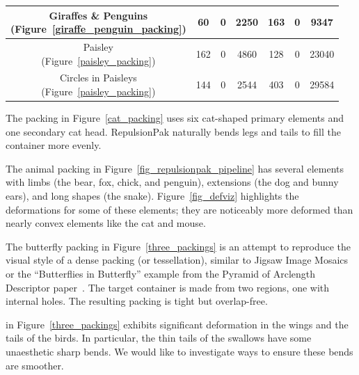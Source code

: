 \begin{table}[t]
{\begin{tabular}{|c|c|c|c|c|c|c|}
\makecell{Giraffes \& Penguins \\(Figure~\ref{giraffe_penguin_packing})}       
& 60    & 0   & 2250  & 163  & 0   & 9347\\ \hline

\makecell{Paisley\\(Figure~\ref{paisley_packing})  }    
& 162   & 0    & 4860  & 128  & 0   & 23040\\ \hline

\makecell{Circles in Paisleys \\(Figure~\ref{paisley_packing})}     
& 144   & 0    & 2544  & 403  & 0   & 29584\\ \hline
\end{tabular}
}
\end{table}





The packing in Figure~\ref{cat_packing} 
uses six cat-shaped primary elements and one secondary cat head.
RepulsionPak naturally bends legs and tails to fill the container more evenly.

The animal packing in Figure~\ref{fig_repulsionpak_pipeline} 
has several elements with limbs (the bear, fox, chick, and penguin),  
extensions (the dog and bunny ears), and long shapes (the snake).
Figure~\ref{fig_defviz} highlights the deformations for some of these elements;
they are noticeably more deformed 
than nearly convex elements like the cat and mouse.


The butterfly packing in Figure~\ref{three_packings} is an attempt to reproduce 
the visual style of a dense packing (or tessellation), similar to Jigsaw Image Mosaics~\cite{Kim2002}
or the ``Butterflies in Butterfly'' example from the
Pyramid of Arclength Descriptor paper~\cite{Kwan2016}. 
The target container is made from two regions,
one with internal holes.  The resulting packing is tight but overlap-free.

 in Figure~\ref{three_packings}
exhibits significant deformation in the wings and the tails of the birds.
In particular, the thin tails of the swallows have some unaesthetic
sharp bends.  We would like to investigate ways to ensure these bends are
smoother.

